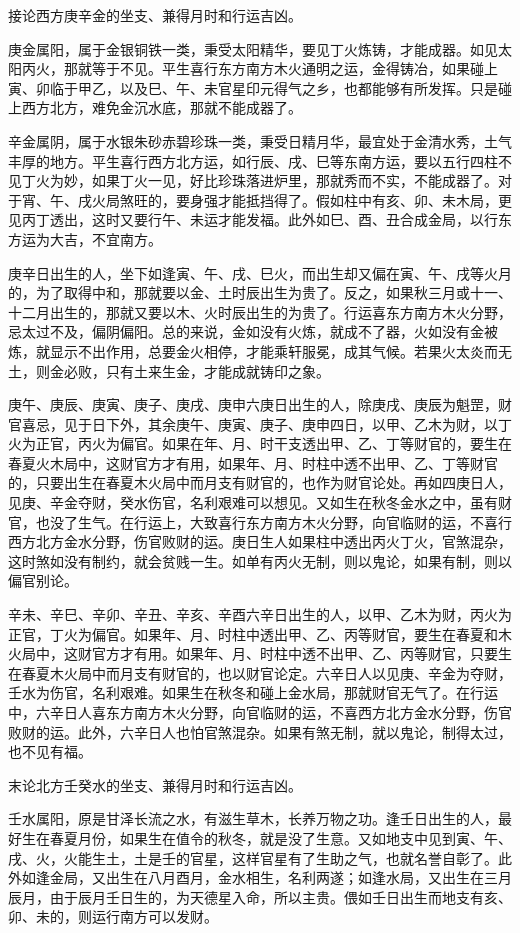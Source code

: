 \documentclass[a5paper,oneside,12pt]{ctexbook}
\begin{document}
接论西方庚辛金的坐支、兼得月时和行运吉凶。

庚金属阳，属于金银铜铁一类，秉受太阳精华，要见丁火炼铸，才能成器。如见太阳丙火，那就等于不见。平生喜行东方南方木火通明之运，金得铸冶，如果碰上寅、卯临于甲乙，以及巳、午、未官星印元得气之乡，也都能够有所发挥。只是碰上西方北方，难免金沉水底，那就不能成器了。

辛金属阴，属于水银朱砂赤碧珍珠一类，秉受日精月华，最宜处于金清水秀，土气丰厚的地方。平生喜行西方北方运，如行辰、戌、巳等东南方运，要以五行四柱不见丁火为妙，如果丁火一见，好比珍珠落进炉里，那就秀而不实，不能成器了。对于宵、午、戌火局煞旺的，要身强才能抵挡得了。假如柱中有亥、卯、未木局，更见丙丁透出，这时又要行午、未运才能发福。此外如巳、酉、丑合成金局，以行东方运为大吉，不宜南方。

庚辛日出生的人，坐下如逢寅、午、戌、巳火，而出生却又偏在寅、午、戌等火月的，为了取得中和，那就要以金、土时辰出生为贵了。反之，如果秋三月或十一、十二月出生的，那就又要以木、火时辰出生的为贵了。行运喜东方南方木火分野，忌太过不及，偏阴偏阳。总的来说，金如没有火炼，就成不了器，火如没有金被炼，就显示不出作用，总要金火相停，才能乘轩服冕，成其气候。若果火太炎而无土，则金必败，只有土来生金，才能成就铸印之象。

庚午、庚辰、庚寅、庚子、庚戌、庚申六庚日出生的人，除庚戌、庚辰为魁罡，财官喜忌，见于日下外，其余庚午、庚寅、庚子、庚申四日，以甲、乙木为财，以丁火为正官，丙火为偏官。如果在年、月、时干支透出甲、乙、丁等财官的，要生在春夏火木局中，这财官方才有用，如果年、月、时柱中透不出甲、乙、丁等财官的，只要出生在春夏木火局中而月支有财官的，也作为财官论处。再如四庚日人，见庚、辛金夺财，癸水伤官，名利艰难可以想见。又如生在秋冬金水之中，虽有财官，也没了生气。在行运上，大致喜行东方南方木火分野，向官临财的运，不喜行西方北方金水分野，伤官败财的运。庚日生人如果柱中透出丙火丁火，官煞混杂，这时煞如没有制约，就会贫贱一生。如单有丙火无制，则以鬼论，如果有制，则以偏官别论。

辛未、辛巳、辛卯、辛丑、辛亥、辛酉六辛日出生的人，以甲、乙木为财，丙火为正官，丁火为偏官。如果年、月、时柱中透出甲、乙、丙等财官，要生在春夏和木火局中，这财官方才有用。如果年、月、时柱中透不出甲、乙、丙等财官，只要生在春夏木火局中而月支有财官的，也以财官论定。六辛日人以见庚、辛金为夺财，壬水为伤官，名利艰难。如果生在秋冬和碰上金水局，那就财官无气了。在行运中，六辛日人喜东方南方木火分野，向官临财的运，不喜西方北方金水分野，伤官败财的运。此外，六辛日人也怕官煞混杂。如果有煞无制，就以鬼论，制得太过，也不见有福。

末论北方壬癸水的坐支、兼得月时和行运吉凶。

壬水属阳，原是甘泽长流之水，有滋生草木，长养万物之功。逢壬日出生的人，最好生在春夏月份，如果生在值令的秋冬，就是没了生意。又如地支中见到寅、午、戌、火，火能生土，土是壬的官星，这样官星有了生助之气，也就名誉自彰了。此外如逢金局，又出生在八月酉月，金水相生，名利两遂；如逢水局，又出生在三月辰月，由于辰月壬日生的，为天德星入命，所以主贵。偎如壬日出生而地支有亥、卯、未的，则运行南方可以发财。
\end{document}
